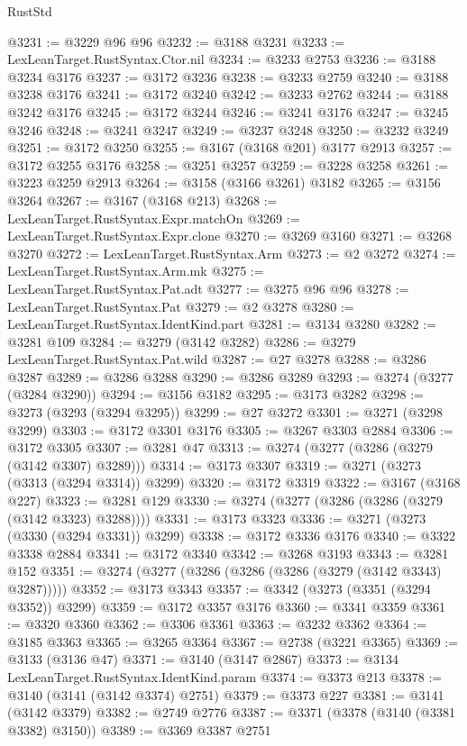 \begin{lexlean}{RustStd}
\begin{coremodule}
@3231 := @3229 @96 @96
@3232 := @3188 @3231
@3233 := LexLeanTarget.RustSyntax.Ctor.nil
@3234 := @3233 @2753
@3236 := @3188 @3234 @3176
@3237 := @3172 @3236
@3238 := @3233 @2759
@3240 := @3188 @3238 @3176
@3241 := @3172 @3240
@3242 := @3233 @2762
@3244 := @3188 @3242 @3176
@3245 := @3172 @3244
@3246 := @3241 @3176
@3247 := @3245 @3246
@3248 := @3241 @3247
@3249 := @3237 @3248
@3250 := @3232 @3249
@3251 := @3172 @3250
@3255 := @3167 (@3168 @201) @3177 @2913
@3257 := @3172 @3255 @3176
@3258 := @3251 @3257
@3259 := @3228 @3258
@3261 := @3223 @3259 @2913
@3264 := @3158 (@3166 @3261) @3182
@3265 := @3156 @3264
@3267 := @3167 (@3168 @213)
@3268 := LexLeanTarget.RustSyntax.Expr.matchOn
@3269 := LexLeanTarget.RustSyntax.Expr.clone
@3270 := @3269 @3160
@3271 := @3268 @3270
@3272 := LexLeanTarget.RustSyntax.Arm
@3273 := @2 @3272
@3274 := LexLeanTarget.RustSyntax.Arm.mk
@3275 := LexLeanTarget.RustSyntax.Pat.adt
@3277 := @3275 @96 @96
@3278 := LexLeanTarget.RustSyntax.Pat
@3279 := @2 @3278
@3280 := LexLeanTarget.RustSyntax.IdentKind.part
@3281 := @3134 @3280
@3282 := @3281 @109
@3284 := @3279 (@3142 @3282)
@3286 := @3279 LexLeanTarget.RustSyntax.Pat.wild
@3287 := @27 @3278
@3288 := @3286 @3287
@3289 := @3286 @3288
@3290 := @3286 @3289
@3293 := @3274 (@3277 (@3284 @3290))
@3294 := @3156 @3182
@3295 := @3173 @3282
@3298 := @3273 (@3293 (@3294 @3295))
@3299 := @27 @3272
@3301 := @3271 (@3298 @3299)
@3303 := @3172 @3301 @3176
@3305 := @3267 @3303 @2884
@3306 := @3172 @3305
@3307 := @3281 @47
@3313 := @3274 (@3277 (@3286 (@3279 (@3142 @3307) @3289)))
@3314 := @3173 @3307
@3319 := @3271 (@3273 (@3313 (@3294 @3314)) @3299)
@3320 := @3172 @3319
@3322 := @3167 (@3168 @227)
@3323 := @3281 @129
@3330 := @3274 (@3277 (@3286 (@3286 (@3279 (@3142 @3323) @3288))))
@3331 := @3173 @3323
@3336 := @3271 (@3273 (@3330 (@3294 @3331)) @3299)
@3338 := @3172 @3336 @3176
@3340 := @3322 @3338 @2884
@3341 := @3172 @3340
@3342 := @3268 @3193
@3343 := @3281 @152
@3351 := @3274 (@3277 (@3286 (@3286 (@3286 (@3279 (@3142 @3343) @3287)))))
@3352 := @3173 @3343
@3357 := @3342 (@3273 (@3351 (@3294 @3352)) @3299)
@3359 := @3172 @3357 @3176
@3360 := @3341 @3359
@3361 := @3320 @3360
@3362 := @3306 @3361
@3363 := @3232 @3362
@3364 := @3185 @3363
@3365 := @3265 @3364
@3367 := @2738 (@3221 @3365)
@3369 := @3133 (@3136 @47)
@3371 := @3140 (@3147 @2867)
@3373 := @3134 LexLeanTarget.RustSyntax.IdentKind.param
@3374 := @3373 @213
@3378 := @3140 (@3141 (@3142 @3374) @2751)
@3379 := @3373 @227
@3381 := @3141 (@3142 @3379)
@3382 := @2749 @2776
@3387 := @3371 (@3378 (@3140 (@3381 @3382) @3150))
@3389 := @3369 @3387 @2751

\end{coremodule}
\end{lexlean}
